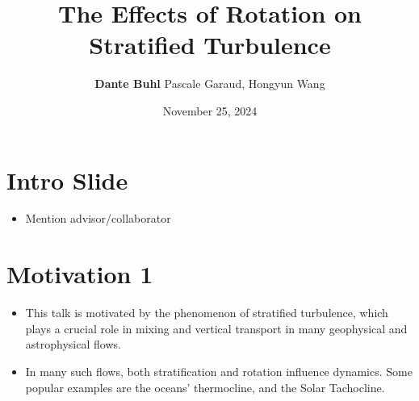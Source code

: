 \documentclass{article}
\begin{document}
\title{The Effects of Rotation on Stratified Turbulence}
\author{\small \textbf{Dante Buhl} Pascale Garaud, Hongyun Wang}
\date{November 25, 2024}


\newcommand{\wrms}{w_{\text{rms}}}
\newcommand{\bs}[1]{\boldsymbol{#1}}
\newcommand{\tb}[1]{\textbf{#1}}
\newcommand{\bmp}[1]{\begin{minipage}{#1\textwidth}}
\newcommand{\emp}{\end{minipage}}
\newcommand{\R}{\mathbb{R}}
\newcommand{\C}{\mathbb{C}}
\newcommand{\N}{\mathcal{N}}
\newcommand{\K}{\bs{\mathrm{K}}}
\newcommand{\m}{\bs{\mu}_*}
\newcommand{\s}{\bs{\Sigma}_*}
\newcommand{\dt}{\Delta t}
\newcommand{\dx}{\Delta x}
\newcommand{\tr}[1]{\text{Tr}(#1)}
\newcommand{\Tr}[1]{\text{Tr}(#1)}
\newcommand{\Div}{\nabla \cdot}
\renewcommand{\div}{\nabla \cdot}
\newcommand{\Curl}{\nabla \times}
\newcommand{\Grad}{\nabla}
\newcommand{\grad}{\nabla}
\newcommand{\grads}{\nabla_s}
\newcommand{\gradf}{\nabla_f}
\newcommand{\xs}{\bs{x}_s}
\newcommand{\xf}{\bs{x}_f}
\newcommand{\ts}{t_s}
\newcommand{\tf}{t_f}
\newcommand{\pt}{\partial t}
\newcommand{\pz}{\partial z}
\newcommand{\uvec}{\bs{u}}
\newcommand{\F}{\bs{F}}
\newcommand{\T}{\tilde{T}}
\newcommand{\ez}{\bs{e}_z}
\newcommand{\ex}{\bs{e}_x}
\newcommand{\ey}{\bs{e}_y}
\newcommand{\eo}{\bs{e}_{\bs{\Omega}}}
\newcommand{\ppt}[1]{\frac{\partial #1}{\partial t}}
\newcommand{\ppts}[1]{\frac{\partial #1}{\partial t_s}}
\newcommand{\pptf}[1]{\frac{\partial #1}{\partial t_f}}
\newcommand{\ppz}[1]{\frac{\partial #1}{\partial z}}
\newcommand{\ddz}[1]{\frac{d #1}{d z}}
\newcommand{\ppzetas}[1]{\frac{\partial^2 #1}{\partial \zeta^2}}
\newcommand{\ppzs}[1]{\frac{\partial #1}{\partial z_s}}
\newcommand{\ppzf}[1]{\frac{\partial #1}{\partial z_f}}
\newcommand{\ppx}[1]{\frac{\partial #1}{\partial x}}
\newcommand{\ppy}[1]{\frac{\partial #1}{\partial y}}
\newcommand{\ppzeta}[1]{\frac{\partial #1}{\partial \zeta}}


\maketitle 

\section{Intro Slide}
\begin{itemize}
    \item Mention advisor/collaborator
\end{itemize}

\section{Motivation 1}
\begin{itemize}
    \item This talk is motivated by the phenomenon of stratified turbulence,
    which plays a crucial role in mixing and vertical transport in many
    geophysical and astrophysical flows. 
    \item In many such flows, both stratification and rotation influence
    dynamics. Some popular examples are the oceans' thermocline, and the Solar
    Tachocline. 
\end{itemize}
\end{document}
